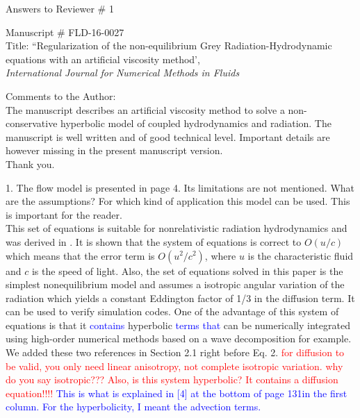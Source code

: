 \documentclass{article}
\newcommand{\tcr}[1]{\textcolor{red}{#1}}
\newcommand{\tcb}[1]{\textcolor{blue}{#1}}
\begin{document}
\begin{center}
{ \Large Answers to Reviewer \# 1}
\end{center}

\bigskip

\noindent Manuscript \# FLD-16-0027 \\
Title: ``Regularization of the non-equilibrium Grey Radiation-Hydrodynamic equations with an artificial viscosity method', \\
{\it International Journal for Numerical Methods in Fluids}\\

\bigskip
\bigskip

{\color{blue}
Comments to the Author: \\ 
The manuscript describes an artificial viscosity method to solve a non-conservative hyperbolic model of coupled hydrodynamics and radiation. The manuscript is well written and of good technical level.
Important details are however missing in the present manuscript version.\\}
Thank you.
\bigskip

{\color{blue}
1. The flow model is presented in page 4. Its limitations are not mentioned. What are the assumptions? For which kind of application this model can be used. This is important for the reader. \\}
This set of equations is suitable for nonrelativistic radiation hydrodynamics and was derived in \cite{LowrieMorelHittinger, LowrieMorel}. It is shown that the system of equations is correct to $O(u/c)$ which means that the error term is $O(u^2/c^2)$, where $u$ is the characteristic fluid and $c$ is the speed of light. Also, the set of equations solved in this paper is the simplest nonequilibrium model and assumes a isotropic angular variation of the radiation which yields a constant Eddington factor of 1/3 in the diffusion term. It can be used to verify simulation codes. One of the advantage of this system of equations is that it \tcb{contains} hyperbolic \tcb{terms that} can be numerically integrated using high-order numerical methods based on a wave decomposition for example. We added these two references in Section 2.1 right before Eq. 2. 
\tcr{for diffusion to be valid, you only need linear anisotropy, not complete isotropic variation. why do you say isotropic??? Also, is this system hyperbolic? It contains a diffusion equation!!!!}
\tcb{This is what is explained in [4] at the bottom of page 131in the first column. For the hyperbolicity, I meant the advection terms.}
\bigskip
\end{document}
